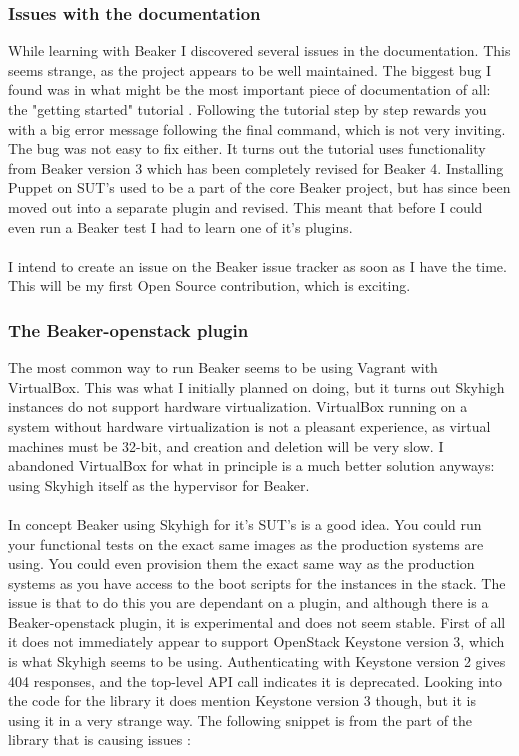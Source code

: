 \subsubsection{Issues with the documentation}

While learning with Beaker I discovered several issues in the documentation. This seems strange, as the project appears to be well maintained. The biggest bug I found was in what might be the most important piece of documentation of all: the "getting started" tutorial \cite{beakertutorialwithproblem}. Following the tutorial step by step rewards you with a big error message following the final command, which is not very inviting. The bug was not easy to fix either. It turns out the tutorial uses functionality from Beaker version 3 which has been completely revised for Beaker 4. Installing Puppet on SUT's used to be a part of the core Beaker project, but has since been moved out into a separate plugin and revised. This meant that before I could even run a Beaker test I had to learn one of it's plugins.
\\
\\
I intend to create an issue on the Beaker issue tracker \cite{beakerissuetracker} as soon as I have the time. This will be my first Open Source contribution, which is exciting.

\subsubsection{The Beaker-openstack plugin}

The most common way to run Beaker seems to be using Vagrant with VirtualBox. This was what I initially planned on doing, but it turns out Skyhigh instances do not support hardware virtualization. VirtualBox running on a system without hardware virtualization is not a pleasant experience, as virtual machines must be 32-bit, and creation and deletion will be very slow. I abandoned VirtualBox for what in principle is a much better solution anyways: using Skyhigh itself as the hypervisor for Beaker.
\\
\\
In concept Beaker using Skyhigh for it's SUT's is a good idea. You could run your functional tests on the exact same images as the production systems are using. You could even provision them the exact same way as the production systems as you have access to the boot scripts for the instances in the stack. The issue is that to do this you are dependant on a plugin, and although there is a Beaker-openstack plugin, it is experimental and does not seem stable. First of all it does not immediately appear to support OpenStack Keystone version 3, which is what Skyhigh seems to be using. Authenticating with Keystone version 2 gives 404 responses, and the top-level API call indicates it is deprecated. Looking into the code for the library it does mention Keystone version 3 though, but it is using it in a very strange way. The following snippet is from the part of the library that is causing issues \cite{beakeropenstackproblematicpart}:

